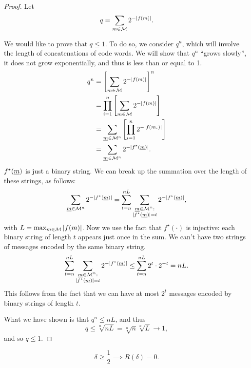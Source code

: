 \begin{proof}
	Let
	\begin{equation*}
		q = \sum_{m \in \mathcal{M}} 2^{-\left|{f(m)}\right|}.
	\end{equation*}

	We would like to prove that $q \le 1$.
	To do so, we consider $q^n$, which will involve the length of concatenations of code words.
	We will show that $q^n$ ``grows slowly'', \ie it does not grow exponentially, and thus is less than or equal to 1. 
	\begin{align*}
		q^n
		& =
		\left[ \sum_{m \in \mathcal{M}} 2^{-\left|{f(m)}\right|} \right]^n
		\\
		& =
		\prod_{i = 1}^n \left[ \sum_{m \in \mathcal{M}} 2^{-\left|{f(m)}\right|} \right]
		\\
		& =
		\sum_{\underline{m} \in \mathcal{M}^n} \left[ \prod_{i = 1}^n 2^{-\left|{f(m_i)}\right|} \right]
		\\
		& =
		\sum_{\underline{m} \in \mathcal{M}^n} 2^{-\left|{f^{\star}(\underline{m})}\right|}.
	\end{align*}
	$f^{\star}(\underline{m})$ is just a binary string.
	We can break up the summation over the length of these strings, as follows:
	\begin{equation*}
		\sum_{\underline{m} \in \mathcal{M}^n} 2^{-\left|{f^{\star}(\underline{m})}\right|}
		=
		\sum_{t = n}^{nL}
		\sum_{
			\substack{
				\underline{m} \in \mathcal{M}^n : \\
				\left|{f^{\star}(\underline{m})}\right| = t
			}
		} 2^{-\left|{f^{\star}(\underline{m})}\right|},
	\end{equation*}
	with $L = \max_{m \in \mathcal{M}} \left|{f(m)}\right|$.
	Now we use the fact that $f^{\star}(\cdot)$ is injective: each binary string of length $t$ appears just once in the sum.
	We can't have two strings of messages encoded by the same binary string.
	\begin{equation*}
		\sum_{t = n}^{nL}
		\sum_{
			\substack{
				\underline{m} \in \mathcal{M}^n : \\
				\left|{f^{\star}(\underline{m})}\right| = t
			}
		} 2^{-\left|{f^{\star}(\underline{m})}\right|}
		\le
		\sum_{t = n}^{nL} 2^t \cdot 2^{-t}
		=
		nL.
	\end{equation*}
	This follows from the fact that we can have at most $2^{t}$ messages encoded by binary strings of length $t$.

	What we have shown is that $q^n \le nL$, and thus
	\begin{equation*}
		q \le \sqrt[n]{nL}
		=
		\sqrt[n]{n} \sqrt[n]{L}
		\to 1,
	\end{equation*}
	and so $q \le 1$.
\end{proof}

\begin{thm}
	\begin{equation*}
		\delta \ge \frac{1}{2} \implies R(\delta) = 0.
	\end{equation*}
\end{thm}

